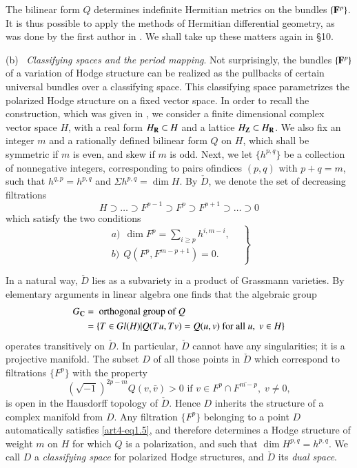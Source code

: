 The bilinear form $Q$ determines indefinite Hermitian metrics on the bundles $\{\mathbf{F}^p\}$. It is thus possible to apply the methods of Hermitian differential geometry, as was done by the first author in \cite{art4-key19}. We shall take up these matters again in \S 10.

\medskip
\noindent
(b)~ \textit{Classifying spaces and the period mapping}. Not surprisingly, the bundles $\{\mathbf{F}^p\}$ of a variation of Hodge structure can be realized as the pullbacks of certain universal bundles over a classifying space. This classifying space parametrizes the polarized Hodge structure on a fixed vector space. In order to recall the construction, which was given in \cite{art4-key18}, we consider a finite dimensional complex vector space $H$, with a real form $H_{\mathbf{R}} \subset H$ and a lattice $H_{\mathbf{Z}} \subset H_{\mathbf{R}}$. We also fix an integer $m$ and a rationally defined bilinear form $Q$ on $H$, which shall be symmetric if $m$ is even, and skew if $m$ is odd. Next, we let $\{h^{p,q}\}$ be a collection of nonnegative integers, corresponding to pairs of\pageoriginale indices $(p,q)$ with $p+q=m$, such that $h^{q,p} = h^{p,q}$ and $\Sigma h^{p,q} = \dim H$. By $\check{D}$, we denote the set of decreasing filtrations
$$
H \supset \ldots \supset F^{p-1} \supset F^p \supset F^{p+1} \supset \ldots \supset 0
$$
which satisfy the two conditions 
\begin{equation}
\left.
\begin{matrix}
a)~~ \dim F^p = \sum_{i \geqslant p} h^{i, m-i},\\[0.2cm]
b)~~ Q (F^p, F^{m-p+1}) = 0.  \quad \quad 
\end{matrix}
\right\} \label{art4-eq3.3}
\end{equation}

In a natural way, $\check{D}$ lies as a subvariety in a product of Grassmann varieties. By elementary arguments in linear algebra one finds that the algebraic group
\begin{align}
G_{\mathbf{C}} & = \text{ orthogonal group of } Q \notag\\
& = \{T \in Gl (H)| Q (Tu , Tv) = Q (u,v) \text{ for all } u, \;v \in H \} \label{art4-eq3.4}
\end{align}
operates transitively on $\check{D}$. In particular, $\check{D}$ cannot have any singularities; it is a projective manifold. The subset $D$ of all those points in $\check{D}$ which correspond to filtrations $\{F^p\}$ with the property
\begin{equation}
(\sqrt{-1})^{2p-m} Q (v, \bar{v}) > 0 \text{ if } v \in F^p \cap \overline{F^{m-p}} , \; v \neq 0, 
\label{art4-eq3.5}
\end{equation}
is open in the Hausdorff topology of $\check{D}$. Hence $D$ inherits the structure of a complex manifold from $D$. Any filtration $\{F^p\}$ belonging to a point $D$ automatically satisfies \eqref{art4-eq1.5}, and therefore determines a Hodge structure of weight $m$ on $H$ for which $Q$ is a polarization, and such that $\dim H^{p,q} = h^{p,q}$. We call $D$ a \textit{classifying space} for polarized Hodge structures, and $\check{D}$ its \textit{dual space}.

